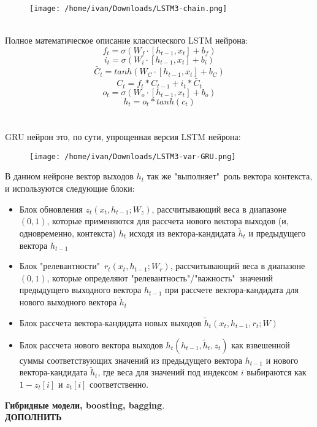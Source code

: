 \documentclass[11pt]{article}
\begin{document}
\\
\\
\begin{figure}[h]
\centering
\texttt{[image: /home/ivan/Downloads/LSTM3-chain.png]}
\label{}
\end{figure}
\\
Полное математическое описание классического LSTM нейрона:
$$ f_t = \sigma( W_f \cdot [h_{t-1},x_t] + b_f) $$
$$ i_t = \sigma( W_i \cdot [h_{t-1},x_t] + b_i) $$
$$ \tilde{C_t} = tanh( W_C \cdot [h_{t-1},x_t] + b_C) $$
$$ C_t = f_t * C_{t-1} + i_t * \tilde{C_t} $$
$$ o_t = \sigma( W_o \cdot [h_{t-1},x_t] + b_o) $$
$$ h_t = o_t * tanh(c_t) $$
\\
\\
GRU нейрон это, по сути, упрощенная версия LSTM нейрона:
\begin{figure}[H]
\centering
\texttt{[image: /home/ivan/Downloads/LSTM3-var-GRU.png]}
\label{}
\end{figure}
В данном нейроне вектор выходов $h_t$ так же "выполняет"\ роль вектора контекста, и используются следующие блоки:
\begin{itemize}
\item Блок обновления $z_t(x_t,h_{t-1};W_z)$, рассчитывающий веса в диапазоне $(0,1)$, которые применяются для рассчета нового вектора выходов (и, одновременно, контекста) $h_t$ исходя из вектора-кандидата $\tilde{h}_t$ и предыдущего вектора $h_{t-1}$
\item Блок "релевантности"\ $r_t(x_t,h_{t-1};W_r)$, рассчитывающий веса в диапазоне $(0,1)$, которые определяют "релевантность"/"важность"\ значений предыдущего выходного вектора $h_{t-1}$ при рассчете вектора-кандидата для нового выходного вектора $\tilde{h}_t$
\item Блок рассчета вектора-кандидата новых выходов $\tilde{h}_t(x_t,h_{t-1},r_t;W)$
\item Блок рассчета нового вектора выходов $h_t(h_{t-1},\tilde{h}_t,z_t)$ как взвешенной суммы соответствующих значений из предыдущего вектора $h_{t-1}$ и нового вектора-кандидата $\tilde{h}_t$, где веса для значений под индексом $i$ выбираются как $1-z_t[i]$ и $z_t[i]$ соответственно.
\end{itemize}
\textbf{Гибридные модели, boosting, bagging}.
\\
\textbf{ДОПОЛНИТЬ}
\end{document}
